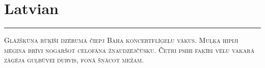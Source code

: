 \vspace{-1em}\section*{\checkno Latvian}
\vspace{-.5em}\hrule\vspace{.5em}
\noindent\textsc{Glāžšķūņa rūķīši dzērumā čiepj Baha koncertflīģeļu vākus.
Muļķa hipiji mēģina brīvi nogaršot celofāna žņaudzējčūsku.
Četri psihi faķīri vēlu vakarā zāģēja guļbūvei durvis, fonā šņācot mežam.
}